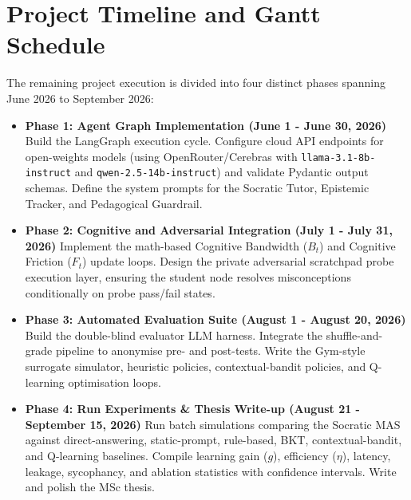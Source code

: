 \documentclass[11pt,a4paper]{report}
\begin{document}
\section{Project Timeline and Gantt Schedule}
The remaining project execution is divided into four distinct phases spanning June 2026 to September 2026:
\begin{itemize}
    \item \textbf{Phase 1: Agent Graph Implementation (June 1 - June 30, 2026)}
    Build the LangGraph execution cycle. Configure cloud API endpoints for open-weights models (using OpenRouter/Cerebras with \texttt{llama-3.1-8b-instruct} and \texttt{qwen-2.5-14b-instruct}) and validate Pydantic output schemas. Define the system prompts for the Socratic Tutor, Epistemic Tracker, and Pedagogical Guardrail.
    \item \textbf{Phase 2: Cognitive and Adversarial Integration (July 1 - July 31, 2026)}
    Implement the math-based Cognitive Bandwidth ($B_t$) and Cognitive Friction ($F_t$) update loops. Design the private adversarial scratchpad probe execution layer, ensuring the student node resolves misconceptions conditionally on probe pass/fail states.
    \item \textbf{Phase 3: Automated Evaluation Suite (August 1 - August 20, 2026)}
    Build the double-blind evaluator LLM harness. Integrate the shuffle-and-grade pipeline to anonymise pre- and post-tests. Write the Gym-style surrogate simulator, heuristic policies, contextual-bandit policies, and Q-learning optimisation loops.
    \item \textbf{Phase 4: Run Experiments \& Thesis Write-up (August 21 - September 15, 2026)}
    Run batch simulations comparing the Socratic MAS against direct-answering, static-prompt, rule-based, BKT, contextual-bandit, and Q-learning baselines. Compile learning gain ($g$), efficiency ($\eta$), latency, leakage, sycophancy, and ablation statistics with confidence intervals. Write and polish the MSc thesis.
\end{itemize}
\end{document}
